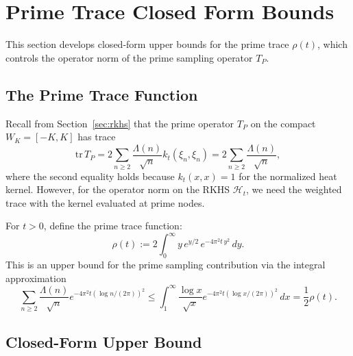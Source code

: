 
\section{Prime Trace Closed Form Bounds}\label{sec:prime-trace-closed}

This section develops closed-form upper bounds for the prime trace $\rho(t)$, which controls the operator norm of the prime sampling operator $T_P$.

\subsection{The Prime Trace Function}

Recall from Section~\ref{sec:rkhs} that the prime operator $T_P$ on the compact $W_K = [-K, K]$ has trace
\begin{equation}
  \mathrm{tr}\, T_P = 2 \sum_{n \geq 2} \frac{\Lambda(n)}{\sqrt{n}} k_t(\xi_n, \xi_n) = 2 \sum_{n \geq 2} \frac{\Lambda(n)}{\sqrt{n}},
\end{equation}
where the second equality holds because $k_t(x, x) = 1$ for the normalized heat kernel. However, for the operator norm on the RKHS $\mathcal{H}_t$, we need the weighted trace with the kernel evaluated at prime nodes.

\begin{definition}
For $t > 0$, define the prime trace function:
\begin{equation}
  \rho(t) := 2 \int_0^\infty y \, e^{y/2} \, e^{-4\pi^2 t \, y^2} \, dy.
\end{equation}
This is an upper bound for the prime sampling contribution via the integral approximation
\begin{equation}
  \sum_{n \geq 2} \frac{\Lambda(n)}{\sqrt{n}} e^{-4\pi^2 t (\log n/(2\pi))^2} \leq \int_1^\infty \frac{\log x}{\sqrt{x}} e^{-4\pi^2 t (\log x/(2\pi))^2} \, dx = \frac{1}{2} \rho(t).
\end{equation}
\end{definition}

\subsection{Closed-Form Upper Bound}


